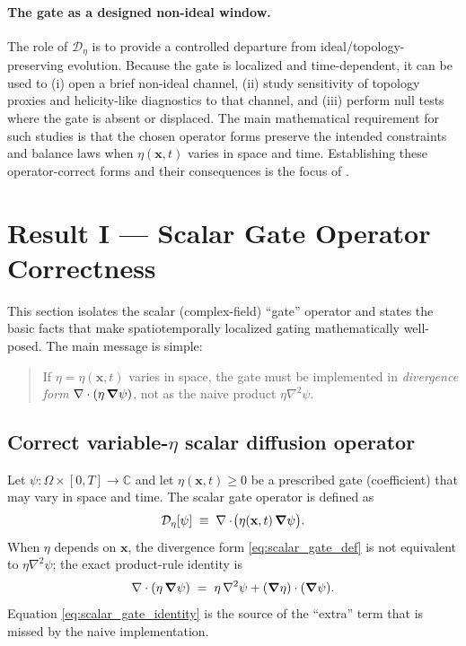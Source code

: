 \documentclass[11pt]{article}
\theoremstyle{plain}
\theoremstyle{definition}
\theoremstyle{remark}
\newcommand{\diver}{\nabla\cdot}
\begin{document}
\paragraph{The gate as a designed non-ideal window.}
The role of $\mathcal{D}_\eta$ is to provide a controlled departure from ideal/topology-preserving evolution. Because the gate is localized and time-dependent, it can be used to (i) open a brief non-ideal channel, (ii) study sensitivity of topology proxies and helicity-like diagnostics to that channel, and (iii) perform null tests where the gate is absent or displaced. The main mathematical requirement for such studies is that the chosen operator forms preserve the intended constraints and balance laws when $\eta(\mathbf{x},t)$ varies in space and time. Establishing these operator-correct forms and their consequences is the focus of .

\section{Result I --- Scalar Gate Operator Correctness}\label{sec:result_scalar}

This section isolates the scalar (complex-field) ``gate'' operator and states the basic facts that make
spatiotemporally localized gating mathematically well-posed. The main message is simple:

\begin{quote}
If $\eta=\eta(\mathbf{x},t)$ varies in space, the gate must be implemented in \emph{divergence form}
$\diver(\eta\,\grad\psi)$, not as the naive product $\eta\nabla^2\psi$.
\end{quote}

\subsection{Correct variable-$\eta$ scalar diffusion operator}\label{sec:result_scalar_operator}
Let $\psi:\Omega\times[0,T]\to\mathbb{C}$ and let $\eta(\mathbf{x},t)\ge 0$ be a prescribed gate
(coefficient) that may vary in space and time. The scalar gate operator is defined as
\begin{equation}\label{eq:scalar_gate_def}
  \mathcal{D}_{\eta}[\psi]
  \;\equiv\;
  \diver\!\big(\eta(\mathbf{x},t)\,\grad \psi\big).
\end{equation}
When $\eta$ depends on $\mathbf{x}$, the divergence form \eqref{eq:scalar_gate_def} is not equivalent to
$\eta\nabla^2\psi$; the exact product-rule identity is
\begin{equation}\label{eq:scalar_gate_identity}
  \diver(\eta\,\grad\psi)
  \;=\;
  \eta\,\nabla^2\psi + (\grad\eta)\cdot(\grad\psi).
\end{equation}
Equation \eqref{eq:scalar_gate_identity} is the source of the ``extra'' term that is missed by the naive
implementation.
\end{document}
